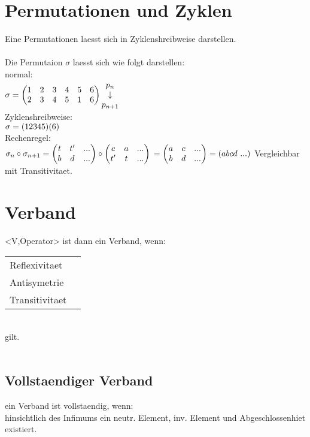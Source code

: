 \documentclass{article}
\begin{document}
\section{Permutationen und Zyklen}
Eine Permutationen laesst sich in Zyklenshreibweise darstellen.\\
\\
Die Permutaion $\sigma$ laesst sich wie folgt darstellen:\\
normal:\\
$
\sigma = \begin{pmatrix}
        1&2&3&4&5&6\\
        2&3&4&5&1&6\\
\end{pmatrix}
\begin{matrix}
        p_n\\
        \downarrow\\
        p_{n+1}\\
\end{matrix}\\
$
\\
Zyklenshreibweise:\\
$
\sigma = (12345)(6)\\
$
\\
Rechenregel:\\
$
    \sigma_n \circ \sigma_{n+1} 
=   \begin{pmatrix}
        t & t'  & ...\\
        b & d   & ...\\
\end{pmatrix} \circ \begin{pmatrix}
        c & a   & ...\\
        t' & t  & ...\\
\end{pmatrix}\\
=   \begin{pmatrix}
        a & c   & ...\\
        b & d   & ...\\
\end{pmatrix} = (abcd\ ...)\\
$
Vergleichbar mit Transitivitaet.\\
\section{Verband}
<V,Operator> ist dann ein Verband, wenn:\\
\begin{tabular}{ll}
        Reflexivitaet   &\\
        Antisymetrie    &\\
        Transitivitaet  &\\
\end{tabular}\\
gilt.\\
\\
\subsection{Vollstaendiger Verband}
ein Verband ist vollstaendig, wenn:\\
hinsichtlich des Infimums ein neutr. Element, inv. Element und Abgeschlossenhiet existiert.\\
\end{document}

